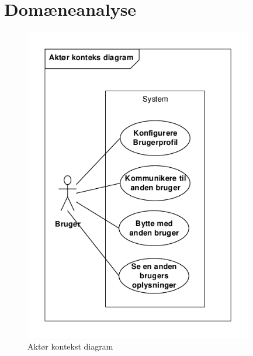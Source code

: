 \section{Domæneanalyse}


\begin{figure}[H]
	\includegraphics[trim = 6mm 6mm 6mm 6mm, clip, width=100mm]{figures/KontekstDiagram.PDF}
	\caption{Aktør kontekst diagram}
	\label{fig:KontekstDia}
	\end{figure}